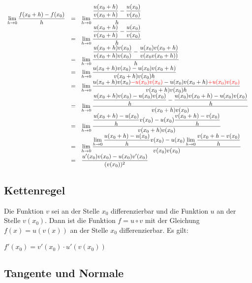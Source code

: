 \begin{Bws}
$
\begin{array}{rcl}
\lim\limits_{h \rightarrow 0} {\dfrac{f(x_{0}+h)-f(x_{0})}{h}}&=& \lim\limits_{h \rightarrow 0} { \dfrac{ \dfrac{u(x_{0}+h)} {v(x_{0}+h)}- \dfrac{u(x_{0})}  {v(x_{0})}}  {h}}\\
&=&\lim\limits_{h \rightarrow 0} {\dfrac{\dfrac {u(x_{0}+h)}{v(x_{0}+h)}-\dfrac {u(x_{0})} {v(x_{0})}}   {h}}\\
&=&\lim\limits_{h \rightarrow 0} {\dfrac {\dfrac{  u(x_{0}+h)v(x_{0})}{v(x_{0}+h)v(x_{0})}   -\dfrac{u(x_{0})v(x_{0}+h)}{v(x_{0}v(x_{0}+h))}} {h}}\\
&=&\lim\limits_{h \rightarrow 0} {\dfrac     {u(x_{0}+h)v(x_{0})-u(x_{0})v(x_{0}+h)}    {v(x_{0}+h)v(x_{0})h }}\\
&=&\lim\limits_{h \rightarrow 0} {\dfrac {u(x_{0}+h)v(x_{0}) \textcolor{red}{-u(x_{0})v(x_{0})} -u(x_{0})v(x_{0}+h) \textcolor{red}{+u(x_{0})v(x_{0})}}  {v(x_{0}+h)v(x_{0})h}   }\\
&=&\lim\limits_{h \rightarrow 0} {\dfrac   {\dfrac{u(x_{0}+h)v(x_{0})-u(x_{0})v(x_{0})}{h}  -   \dfrac{u(x_{0})v(x_{0}+h)-u(x_{0})v(x_{0})} {h} }    {v(x_{0}+h)v(x_{0})}}\\
&=&\lim\limits_{h \rightarrow 0} { \dfrac     {\dfrac{u(x_{0}+h)-u(x_{0})}{h} v(x_{0})  -   u(x_{0}) \dfrac   {v(x_{0}+h)-v(x_{0})}  {h}  }         {v(x_{0}+h)v(x_{0})}     }\\
&=&\lim\limits_{h \rightarrow 0} { \dfrac  {\lim\limits_{h \rightarrow 0} {\dfrac{u(x_{0}+h)-u(x_{0})}{h}   }v(x_{0})  - u(x_{0}) \lim\limits_{h \rightarrow 0} { \dfrac{ v(x_{0}+h-v(x_{0})}{h}   }  }      {v(x_{0})v(x_{0})}}    \\
&=& { \dfrac{u'(x_{0})v(x_{0})-u(x_{0})v'(x_{0})} {(v(x_{0}))^2}    }\\
\end{array}
$
\end{Bws}

\subsection{Kettenregel}

Die Funktion $v$ sei an der Stelle $x_{0}$ differenzierbar und die Funktion $u$ an der Stelle $v(x_{0})$. Dann ist die Funktion $f=u\circ v$ mit der Gleichung $f(x)= u(v(x))$ an der Stelle $x_{0}$ differenzierbar. Es gilt:

$f'(x_{0})=v'(x_{0})\cdot u'(v(x_{0}))$


\subsection{Tangente und Normale}

